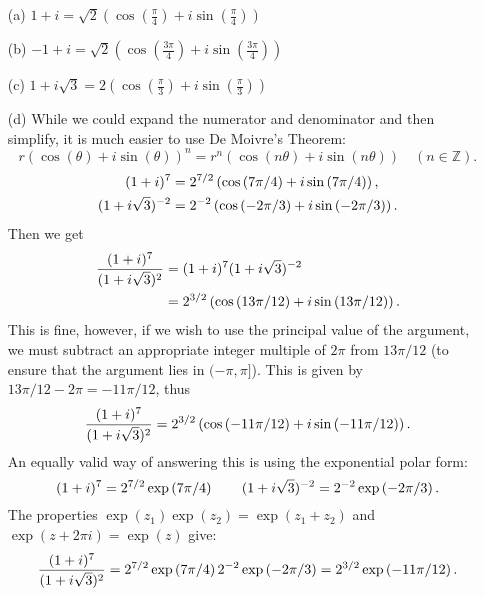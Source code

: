 \begin{questions}
\begin{answer}
\begin{enumerate}
\item[(a)] $1+i=\sqrt{2} \left( \cos ( \frac{\pi}{4} ) + i \sin ( \frac{\pi}{4} ) \right)$
\item[(b)] $-1+i=\sqrt{2} \left( \cos ( \frac{3\pi}{4} ) + i \sin ( \frac{3\pi}{4} ) \right)$
\item[(c)] $1+i\sqrt{3}=2 \left( \cos ( \frac{\pi}{3} ) + i \sin ( \frac{\pi}{3} ) \right)$
\item[(d)] While we could expand the numerator and denominator and then simplify, it is much easier to use De Moivre's Theorem:
\[
r \left( \cos ( \theta) + i \sin (\theta ) \right)^n = r^n \left( \cos ( n\theta) + i \sin ( n \theta ) \right) \quad (n \in \mathbb{Z}).
\]
\begin{align*}
(1+i)^7 & = 2^{7/2} \left( \cos \left( 7 \pi / 4 \right) + i \sin \left( 7 \pi / 4 \right) \right),\\ 
(1+ i \sqrt{3})^{-2} & = 2^{-2} \left( \cos \left( -2\pi/3 \right) + i \sin \left( -2\pi/3 \right) \right).
\end{align*}
Then we get
\begin{align*}
\frac{(1+i)^7}{(1+i\sqrt{3})^2} & = (1+i)^7(1+i \sqrt{3})^{-2} \\
& = 2^{3/2} \left( \cos \left( 13\pi/12 \right) + i \sin \left( 13\pi/12 \right) \right). 
\end{align*}
This is fine, however, if we wish to use the principal value of the argument, we must subtract an appropriate integer multiple of $2\pi$ from $13\pi/12$ (to ensure that the argument lies in $(-\pi,\pi]$).  This is given by  $13\pi /12-2\pi = -11\pi/12$, thus
\[
\frac{(1+i)^7}{(1+i\sqrt{3})^2} = 2^{3/2} \left( \cos \left( -11\pi /12 \right) + i \sin \left( -11\pi /12 \right) \right).
\]
An equally valid way of answering this is using the exponential polar form:
\[
(1+i)^7 = 2^{7/2} \exp \left( 7 \pi / 4 \right)\qquad(1+ i \sqrt{3})^{-2} = 2^{-2} \exp \left( -2\pi/3 \right).
\]
The properties $\exp(z_1)\exp(z_2)=\exp(z_1+z_2)$ and $\exp(z+2\pi i)=\exp(z)$  give:
\[
\frac{(1+i)^7}{(1+i\sqrt{3})^2} = 2^{7/2} \exp \left( 7 \pi/4 \right) 2^{-2} \exp \left( -2\pi/3 \right)  =  2^{3/2} \exp \left( -11\pi/12 \right).
\]
\end{enumerate}
\end{answer}

\question 
{}


\end{questions}
